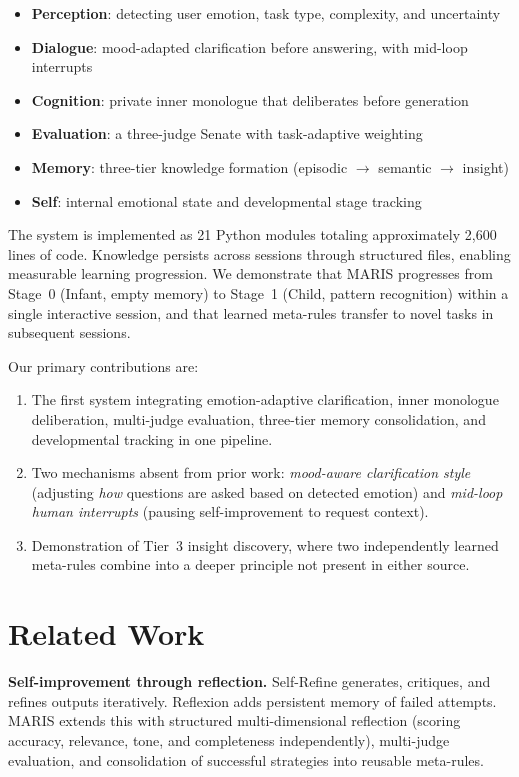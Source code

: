 \documentclass[11pt,a4paper]{article}
\begin{document}
\begin{itemize}[nosep]
\item \textbf{Perception}: detecting user emotion, task type, complexity, and uncertainty
\item \textbf{Dialogue}: mood-adapted clarification before answering, with mid-loop interrupts
\item \textbf{Cognition}: private inner monologue that deliberates before generation
\item \textbf{Evaluation}: a three-judge Senate with task-adaptive weighting
\item \textbf{Memory}: three-tier knowledge formation (episodic $\rightarrow$ semantic $\rightarrow$ insight)
\item \textbf{Self}: internal emotional state and developmental stage tracking
\end{itemize}

The system is implemented as 21 Python modules totaling approximately 2,600 lines of code. Knowledge persists across sessions through structured files, enabling measurable learning progression. We demonstrate that MARIS progresses from Stage~0 (Infant, empty memory) to Stage~1 (Child, pattern recognition) within a single interactive session, and that learned meta-rules transfer to novel tasks in subsequent sessions.

Our primary contributions are:
\begin{enumerate}[nosep]
\item The first system integrating emotion-adaptive clarification, inner monologue deliberation, multi-judge evaluation, three-tier memory consolidation, and developmental tracking in one pipeline.
\item Two mechanisms absent from prior work: \textit{mood-aware clarification style} (adjusting \textit{how} questions are asked based on detected emotion) and \textit{mid-loop human interrupts} (pausing self-improvement to request context).
\item Demonstration of Tier~3 insight discovery, where two independently learned meta-rules combine into a deeper principle not present in either source.
\end{enumerate}

\section{Related Work}

\textbf{Self-improvement through reflection.} Self-Refine \cite{madaan2023selfrefine} generates, critiques, and refines outputs iteratively. Reflexion \cite{shinn2023reflexion} adds persistent memory of failed attempts. MARIS extends this with structured multi-dimensional reflection (scoring accuracy, relevance, tone, and completeness independently), multi-judge evaluation, and consolidation of successful strategies into reusable meta-rules.
\end{document}
